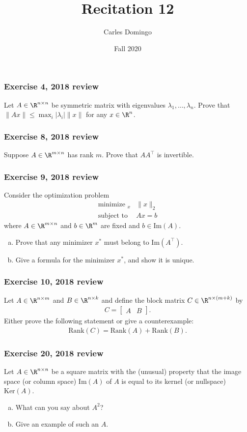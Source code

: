 \documentclass{beamer}
\title{Recitation 12}
\author{Carles Domingo}
\date{Fall 2020}
\begin{document}
\frame{\titlepage} 

\setcounter{showProgressBar}{0}
\setcounter{showSlideNumbers}{1}

\begin{frame}[t]
\frametitle{Exercise 4, 2018 review}
Let $A \in \R^{n \times n}$ be symmetric matrix with eigenvalues $\lambda_1, \dots, \lambda_n$. Prove that $\|Ax\| \leq \max_i |\lambda_i| \|x\|$ for any $x \in \R^n$.
\pause
\end{frame}

\begin{frame}[t]
\frametitle{Exercise 8, 2018 review}
Suppose $A \in \R^{m \times n}$ has rank $m$. Prove that $A A^{\top}$ is invertible.
\pause
\end{frame}

\begin{frame}[t]
\frametitle{Exercise 9, 2018 review}
\vspace{-5pt}
Consider the optimization problem
\begin{align*}
\text{minimize }_x &\|x\|_2 \\
\text{subject to } &Ax = b 
\end{align*}
where $A \in \R^{m \times n}$ and $b \in \R^m$ are fixed and $b \in \text{Im}(A)$.
\begin{enumerate}[(a)]
\item Prove that any minimizer $x^{*}$ must belong to $\text{Im}(A^{\top})$.
\item Give a formula for the minimizer $x^{*}$, and show it is unique.
\end{enumerate}
\pause
\pause
\end{frame}

\begin{frame}[t]
\frametitle{Exercise 10, 2018 review}
\vspace{-5pt}
Let $A \in \R^{n \times m}$ and $B \in \R^{n \times k}$ and define the block matrix $C \in \R^{n \times (m+k)}$ by 
\begin{align*}
C = \begin{bmatrix}
A & B
\end{bmatrix}.
\end{align*}
Either prove the following statement or give a counterexample: 
\begin{align*}
\text{Rank}(C) = \text{Rank}(A) + \text{Rank}(B).
\end{align*}
\pause
\end{frame}

\begin{frame}[t]
\frametitle{Exercise 20, 2018 review}
\vspace{-5pt}
Let $A \in \R^{n \times n}$ be a square matrix with the (unusual) property that the image space (or column space) $\text{Im}(A)$ of $A$ is equal to its kernel (or nullspace) $\text{Ker}(A)$.
\begin{enumerate}[(a)]
\item What can you say about $A^2$? 
\item Give an example of such an $A$.
\end{enumerate}
\pause
\end{frame}
\end{document}

